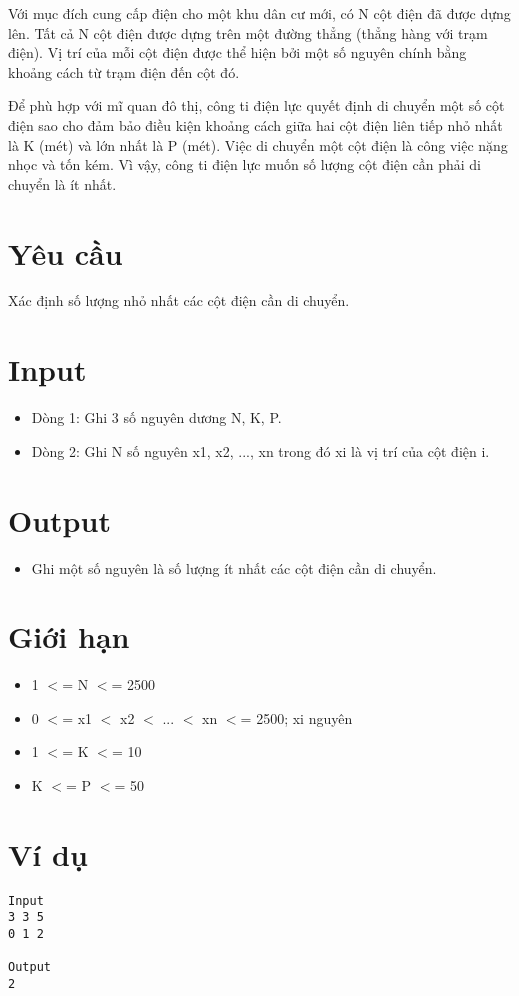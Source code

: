 



   Với mục đích cung cấp điện cho một khu dân cư mới, có N cột điện đã được dựng lên. Tất cả N cột điện được dựng trên một đường thẳng (thẳng hàng với trạm điện). Vị trí của mỗi cột điện được thể hiện bởi một số nguyên chính bằng khoảng cách từ trạm điện đến cột đó.  

   Để phù hợp với mĩ quan đô thị, công ti điện lực quyết định di chuyển một số cột điện sao cho đảm bảo điều kiện khoảng cách giữa hai cột điện liên tiếp nhỏ nhất là K (mét) và lớn nhất là P (mét). Việc di chuyển một cột điện là công việc nặng nhọc và tốn kém. Vì vậy, công ti điện lực muốn số lượng cột điện cần phải di chuyển là ít nhất.  

\section{   Yêu cầu  }

   Xác định số lượng nhỏ nhất các cột điện cần di chuyển.  

\section{   Input  }
\begin{itemize}
	\item     Dòng 1: Ghi 3 số nguyên dương N, K, P.   
	\item     Dòng 2: Ghi N số nguyên x1, x2, ..., xn trong đó xi là vị trí của cột điện i.   
\end{itemize}

\section{   Output  }
\begin{itemize}
	\item     Ghi một số nguyên là số lượng ít nhất các cột điện cần di chuyển.   
\end{itemize}

\section{   Giới hạn  }
\begin{itemize}
	\item     1 $<$= N $<$= 2500   
	\item     0 $<$= x1 $<$ x2 $<$ ... $<$ xn $<$= 2500; xi nguyên   
	\item     1 $<$= K $<$= 10   
	\item     K $<$= P $<$= 50   
\end{itemize}

\section{   Ví dụ  }
\begin{verbatim}
Input
3 3 5
0 1 2

Output
2
\end{verbatim}